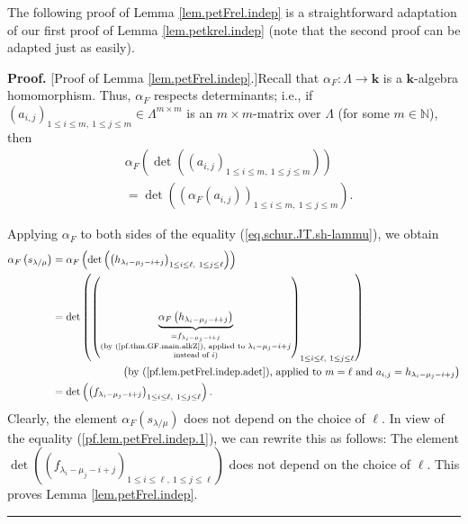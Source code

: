 \documentclass[numbers=enddot,12pt,final,onecolumn,notitlepage]{scrartcl}%
\theoremstyle{definition}
\newenvironment{proof}[1][Proof]{\noindent\textbf{#1.} }{\ \rule{0.5em}{0.5em}}
\newenvironment{verlong}{}{}
\begin{document}
\begin{verlong}
The following proof of Lemma \ref{lem.petFrel.indep} is a straightforward
adaptation of our first proof of Lemma \ref{lem.petkrel.indep} (note that the
second proof can be adapted just as easily).

\begin{proof}
[Proof of Lemma \ref{lem.petFrel.indep}.]Recall that $\alpha_{F}%
:\Lambda\rightarrow\mathbf{k}$ is a $\mathbf{k}$-algebra homomorphism. Thus,
$\alpha_{F}$ respects determinants; i.e., if $\left(  a_{i,j}\right)  _{1\leq
i\leq m,\ 1\leq j\leq m}\in\Lambda^{m\times m}$ is an $m\times m$-matrix over
$\Lambda$ (for some $m\in\mathbb{N}$), then%
\begin{align}
&  \alpha_{F}\left(  \det\left(  \left(  a_{i,j}\right)  _{1\leq i\leq
m,\ 1\leq j\leq m}\right)  \right) \nonumber\\
&  =\det\left(  \left(  \alpha_{F}\left(  a_{i,j}\right)  \right)  _{1\leq
i\leq m,\ 1\leq j\leq m}\right)  . \label{pf.lem.petFrel.indep.adet}%
\end{align}


Applying $\alpha_{F}$ to both sides of the equality
(\ref{eq.schur.JT.sh-lammu}), we obtain%
\begin{align}
\alpha_{F}\left(  s_{\lambda/\mu}\right)   &  =\alpha_{F}\left(  \det\left(
\left(  h_{\lambda_{i}-\mu_{j}-i+j}\right)  _{1\leq i\leq\ell,\ 1\leq
j\leq\ell}\right)  \right) \nonumber\\
&  =\det\left(  \left(  \underbrace{\alpha_{F}\left(  h_{\lambda_{i}-\mu
_{j}-i+j}\right)  }_{\substack{=f_{\lambda_{i}-\mu_{j}-i+j}\\\text{(by
(\ref{pf.thm.GF.main.alkZ}), applied to }\lambda_{i}-\mu_{j}%
-i+j\\\text{instead of }i\text{)}}}\right)  _{1\leq i\leq\ell,\ 1\leq
j\leq\ell}\right) \nonumber\\
&  \ \ \ \ \ \ \ \ \ \ \ \ \ \ \ \ \ \ \ \ \left(  \text{by
(\ref{pf.lem.petFrel.indep.adet}), applied to }m=\ell\text{ and }%
a_{i,j}=h_{\lambda_{i}-\mu_{j}-i+j}\right) \nonumber\\
&  =\det\left(  \left(  f_{\lambda_{i}-\mu_{j}-i+j}\right)  _{1\leq i\leq
\ell,\ 1\leq j\leq\ell}\right)  . \label{pf.lem.petFrel.indep.1}%
\end{align}
Clearly, the element $\alpha_{F}\left(  s_{\lambda/\mu}\right)  $ does not
depend on the choice of $\ell$. In view of the equality
(\ref{pf.lem.petFrel.indep.1}), we can rewrite this as follows: The element
$\det\left(  \left(  f_{\lambda_{i}-\mu_{j}-i+j}\right)  _{1\leq i\leq
\ell,\ 1\leq j\leq\ell}\right)  $ does not depend on the choice of $\ell$.
This proves Lemma \ref{lem.petFrel.indep}.
\end{proof}


\end{verlong}
\end{document}
